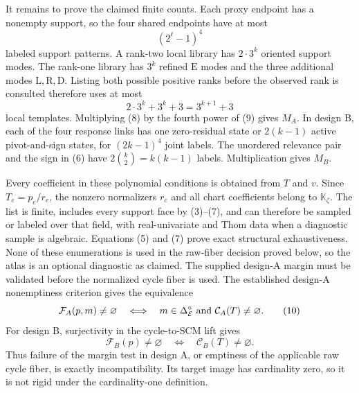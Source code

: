 It remains to prove the claimed finite counts.  Each proxy endpoint has a nonempty support, so the four shared endpoints have at most
\[
(2^{\ell}-1)^4                                               \tag{8}
\]
labeled support patterns.  A rank-two local library has \(2\cdot3^k\) oriented support modes.  The rank-one library has \(3^k\) refined \(\mathrm E\) modes and the three additional modes \(\mathrm L,\mathrm R,\mathrm D\).  Listing both possible positive ranks before the observed rank is consulted therefore uses at most
\[
2\cdot3^k+3^k+3=3^{k+1}+3                                  \tag{9}
\]
local templates.  Multiplying (8) by the fourth power of (9) gives \(M_A\).  In design B, each of the four response links has one zero-residual state or \(2(k-1)\) active pivot-and-sign states, for \((2k-1)^4\) joint labels.  The unordered relevance pair and the sign in (6) have \(2\binom{k}{2}=k(k-1)\) labels.  Multiplication gives \(M_B\).

Every coefficient in these polynomial conditions is obtained from \(T\) and \(v\).  Since \(T_e=p_e/r_e\), the nonzero normalizers \(r_e\) and all chart coefficients belong to \(\mathbb K_{\zeta}\).  The list is finite, includes every support face by (3)--(7), and can therefore be sampled or labeled over that field, with real-univariate and Thom data when a diagnostic sample is algebraic.  Equations (5) and (7) prove exact structural exhaustiveness.  None of these enumerations is used in the raw-fiber decision proved below, so the atlas is an optional diagnostic as claimed.
The supplied design-A margin must be validated before the normalized cycle fiber is used.  The established design-A nonemptiness criterion gives the equivalence
\[
\mathcal F_A(p,m)\neq\varnothing
\quad\Longleftrightarrow\quad
m\in\Delta_{\mathcal E}^{\circ}
\ \hbox{and}\ 
\mathcal C_A(T)\neq\varnothing.                             \tag{10}
\]
For design B, surjectivity in the cycle-to-SCM lift gives
\[
\mathcal F_B(p)\neq\varnothing
\quad\Longleftrightarrow\quad
\mathcal C_B(T)\neq\varnothing.                             \tag{11}
\]
Thus failure of the margin test in design A, or emptiness of the applicable raw cycle fiber, is exactly incompatibility.  Its target image has cardinality zero, so it is not rigid under the cardinality-one definition.

